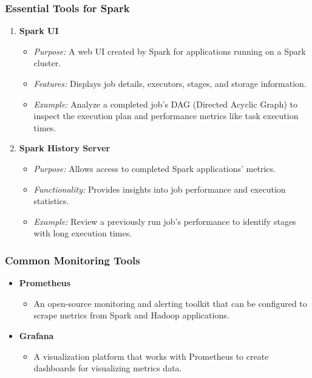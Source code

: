 \documentclass[aspectratio=169]{beamer}
\begin{document}
\begin{frame}[fragile]
    \frametitle{Essential Tools for Spark}
    \begin{enumerate}
        \item \textbf{Spark UI}
            \begin{itemize}
                \item \textit{Purpose:} A web UI created by Spark for applications running on a Spark cluster.
                \item \textit{Features:} Displays job details, executors, stages, and storage information.
                \item \textit{Example:} Analyze a completed job’s DAG (Directed Acyclic Graph) to inspect the execution plan and performance metrics like task execution times.
            \end{itemize}
        \item \textbf{Spark History Server}
            \begin{itemize}
                \item \textit{Purpose:} Allows access to completed Spark applications' metrics.
                \item \textit{Functionality:} Provides insights into job performance and execution statistics.
                \item \textit{Example:} Review a previously run job's performance to identify stages with long execution times.
            \end{itemize}
    \end{enumerate}
\end{frame}

\begin{frame}[fragile]
    \frametitle{Common Monitoring Tools}
    \begin{itemize}
        \item \textbf{Prometheus}
            \begin{itemize}
                \item An open-source monitoring and alerting toolkit that can be configured to scrape metrics from Spark and Hadoop applications.
            \end{itemize}
        \item \textbf{Grafana}
            \begin{itemize}
                \item A visualization platform that works with Prometheus to create dashboards for visualizing metrics data.
            \end{itemize}
    \end{itemize}
\end{frame}
\end{document}
